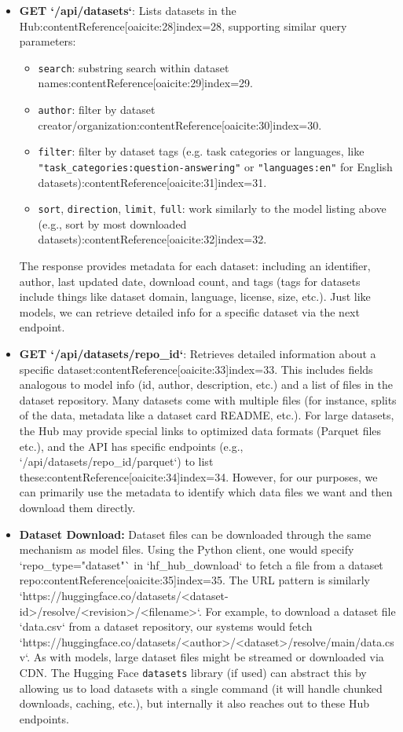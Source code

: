 \documentclass{article}
\begin{document}
\begin{itemize}
    \item \textbf{GET `/api/datasets`}: Lists datasets in the Hub:contentReference[oaicite:28]{index=28}, supporting similar query parameters:
    \begin{itemize}
        \item \texttt{search}: substring search within dataset names:contentReference[oaicite:29]{index=29}.
        \item \texttt{author}: filter by dataset creator/organization:contentReference[oaicite:30]{index=30}.
        \item \texttt{filter}: filter by dataset tags (e.g. task categories or languages, like \texttt{"task\_categories:question-answering"} or \texttt{"languages:en"} for English datasets):contentReference[oaicite:31]{index=31}.
        \item \texttt{sort}, \texttt{direction}, \texttt{limit}, \texttt{full}: work similarly to the model listing above (e.g., sort by most downloaded datasets):contentReference[oaicite:32]{index=32}.
    \end{itemize}
    The response provides metadata for each dataset: including an identifier, author, last updated date, download count, and tags (tags for datasets include things like dataset domain, language, license, size, etc.). Just like models, we can retrieve detailed info for a specific dataset via the next endpoint.
    \item \textbf{GET `/api/datasets/{repo_id}`}: Retrieves detailed information about a specific dataset:contentReference[oaicite:33]{index=33}. This includes fields analogous to model info (id, author, description, etc.) and a list of files in the dataset repository. Many datasets come with multiple files (for instance, splits of the data, metadata like a dataset card README, etc.). For large datasets, the Hub may provide special links to optimized data formats (Parquet files etc.), and the API has specific endpoints (e.g., `/api/datasets/{repo_id}/parquet`) to list these:contentReference[oaicite:34]{index=34}. However, for our purposes, we can primarily use the metadata to identify which data files we want and then download them directly.
    \item \textbf{Dataset Download:} Dataset files can be downloaded through the same mechanism as model files. Using the Python client, one would specify `repo_type="dataset"` in `hf_hub_download` to fetch a file from a dataset repo:contentReference[oaicite:35]{index=35}. The URL pattern is similarly `https://huggingface.co/datasets/<dataset-id>/resolve/<revision>/<filename>`. For example, to download a dataset file `data.csv` from a dataset repository, our systems would fetch `https://huggingface.co/datasets/<author>/<dataset>/resolve/main/data.csv`. As with models, large dataset files might be streamed or downloaded via CDN. The Hugging Face \texttt{datasets} library (if used) can abstract this by allowing us to load datasets with a single command (it will handle chunked downloads, caching, etc.), but internally it also reaches out to these Hub endpoints.
\end{itemize}
\end{document}

